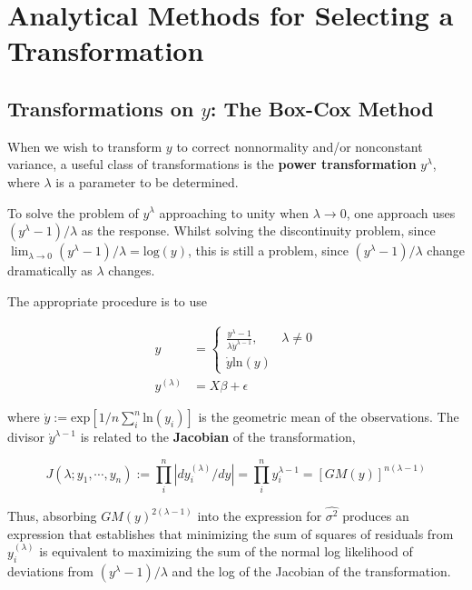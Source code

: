 \documentclass[12pt]{article}
\begin{document}
\section{Analytical Methods for Selecting a Transformation}

\subsection{Transformations on $y$: The Box-Cox Method}

When we wish to transform $y$ to correct nonnormality and/or nonconstant variance, a useful class of transformations is the \textbf{power transformation} $y^\lambda$, where $\lambda$ is a parameter to be determined. 

To solve the problem of $y^\lambda$ approaching to unity when $\lambda \to 0$, one approach uses $(y^\lambda - 1)/\lambda$ as the response. Whilst solving the discontinuity problem, since $\lim_{\lambda \to 0} (y^\lambda - 1)/\lambda = \mathrm{log}(y)$, this is still a problem, since $(y^\lambda - 1)/\lambda$ change dramatically as $\lambda$ changes. 

The appropriate procedure is to use

$$
\begin{aligned}
y &= \begin{cases} \frac{y^\lambda - 1}{\lambda \dot{y}^{\lambda-1}}, & \lambda \neq 0 \\
                   \dot{y} \mathrm{ln}(y) \end{cases} \\[8pt]
y^{(\lambda)} &= X\beta + \epsilon
\end{aligned}
$$

where $\dot{y} := \mathrm{exp} [ 1/n \sum_i^n \mathrm{ln} (y_i) ]$ is the geometric mean of the observations. The divisor $\dot{y}^{\lambda - 1}$ is related to the \textbf{Jacobian} of the transformation,

$$
J(\lambda; y_1, \cdots, y_n) := \prod_i^n |dy_i^{(\lambda)}/dy| = \prod_i^n y_i^{\lambda-1} = [GM(y)]^{n(\lambda-1)}
$$

Thus, absorbing $GM(y)^{2(\lambda-1)}$ into the expression for $\hat{\sigma^2}$ produces an expression that establishes that minimizing the sum of squares of residuals from $y_i^{(\lambda)}$ is equivalent to maximizing the sum of the normal log likelihood of deviations from $(y^\lambda-1)/\lambda$ and the log of the Jacobian of the transformation.
\end{document}

